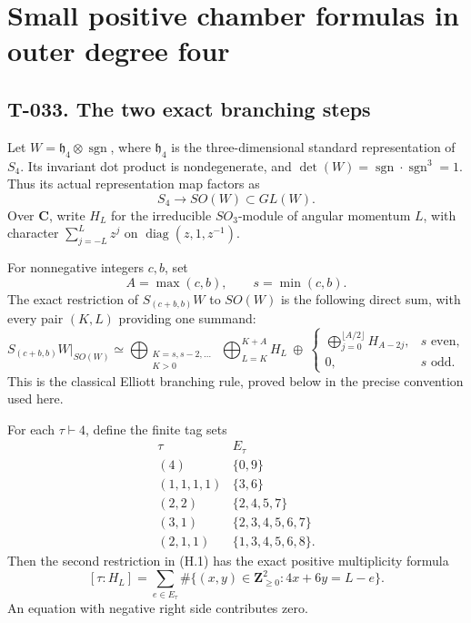 \documentclass[
  10pt,
]{article}
\begin{document}
\section{Small positive chamber formulas in outer degree
four}\label{small-positive-chamber-formulas-in-outer-degree-four}

\subsection{T-033. The two exact branching
steps}\label{t-033.-the-two-exact-branching-steps}

Let \(W=\mathfrak h_4\otimes\operatorname{sgn}\), where
\(\mathfrak h_4\) is the three-dimensional standard representation of
\(S_4\). Its invariant dot product is nondegenerate, and
\(\det(W)=\operatorname{sgn}\cdot\operatorname{sgn}^3=1\). Thus its
actual representation map factors as \[
S_4\longrightarrow SO(W)\subset GL(W).
\tag{H.1}
\] Over \(\mathbf C\), write \(H_L\) for the irreducible \(SO_3\)-module
of angular momentum \(L\), with character \(\sum_{j=-L}^L z^j\) on
\(\operatorname{diag}(z,1,z^{-1})\).

For nonnegative integers \(c,b\), set \[
A=\max(c,b),\qquad s=\min(c,b).
\] The exact restriction of \(S_{(c+b,b)}W\) to \(SO(W)\) is the
following direct sum, with every pair \((K,L)\) providing one summand:
\[
\boxed{
S_{(c+b,b)}W\big|_{SO(W)}
\simeq
\bigoplus_{\substack{K=s,s-2,\ldots\\K>0}}
\ \bigoplus_{L=K}^{K+A}H_L
\ \oplus\
\begin{cases}
\displaystyle\bigoplus_{j=0}^{\lfloor A/2\rfloor}H_{A-2j},
&s\text{ even},\\[2mm]
0,&s\text{ odd}.
\end{cases}}
\tag{H.2}
\] This is the classical Elliott branching rule, proved below in the
precise convention used here.

For each \(\tau\vdash4\), define the finite tag sets \[
\begin{array}{c|c}
\tau&E_\tau\\ \hline
(4)&\{0,9\}\\
(1,1,1,1)&\{3,6\}\\
(2,2)&\{2,4,5,7\}\\
(3,1)&\{2,3,4,5,6,7\}\\
(2,1,1)&\{1,3,4,5,6,8\}.
\end{array}
\tag{H.3}
\] Then the second restriction in (H.1) has the exact positive
multiplicity formula \[
\boxed{
[\tau:H_L]
=\sum_{e\in E_\tau}
\#\{(x,y)\in\mathbf Z_{\ge0}^2:4x+6y=L-e\}.}
\tag{H.4}
\] An equation with negative right side contributes zero.
\end{document}
